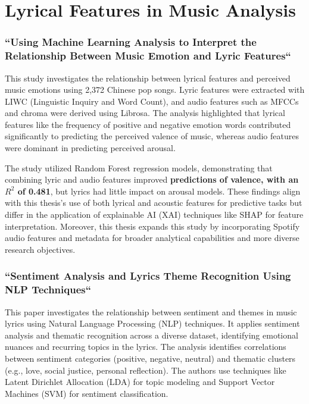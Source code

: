 
\section{Lyrical Features in Music Analysis}
\label{sec:lyricalfeaturesinmusicanalysis}

\subsubsection*{``Using Machine Learning Analysis to Interpret the Relationship
Between Music Emotion and Lyric Features``}


This study investigates the relationship between lyrical features and perceived
music emotions using 2,372 Chinese pop songs. Lyric features were extracted
with LIWC (Linguistic Inquiry and Word Count), and audio features
such as MFCCs and chroma were derived using Librosa. The analysis highlighted
that lyrical features like the frequency of positive and negative emotion words
contributed significantly to predicting the perceived valence of music, whereas
audio features were dominant in predicting perceived arousal.\cite{valence_and_lyrics}

The study utilized Random Forest regression models, demonstrating that
combining lyric and audio features improved \textbf{predictions of valence,
with an $R^2$ of 0.481}, but lyrics had little impact on arousal models. These
findings align with this thesis's use of both lyrical and acoustic features for
predictive tasks but differ in the application of explainable AI (XAI)
techniques like SHAP for feature interpretation. Moreover, this thesis expands
this study by incorporating Spotify audio features and metadata for broader
analytical capabilities and more diverse research objectives.


\subsubsection*{``Sentiment Analysis and Lyrics Theme Recognition Using NLP Techniques``}


This paper investigates the relationship between sentiment and themes in music
lyrics using Natural Language Processing (NLP) techniques. It applies sentiment
analysis and thematic recognition across a diverse dataset, identifying
emotional nuances and recurring topics in the lyrics. The analysis identifies
correlations between sentiment categories (positive, negative, neutral) and
thematic clusters (e.g., love, social justice, personal reflection). The
authors use techniques like Latent Dirichlet Allocation (LDA) for topic
modeling and Support Vector Machines (SVM) for sentiment classification.\cite{du_2024}

